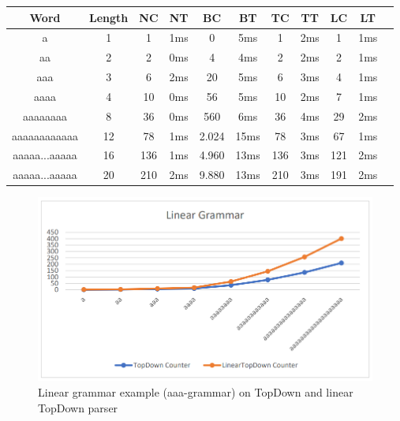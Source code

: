 \documentclass[a4paper, 11pt]{article}
\begin{document}
\begin{center}
\begin{tabular}{|c|c||c|c||c|c||c|c||c|c|c|}
\hline
Word & Length & NC & NT & BC & BT & TC & TT & LC & LT \\
\hline
\hline
a & 1 & 1 & 1ms & 0 & 5ms & 1 & 2ms & 1 & 1ms \\
\hline
aa & 2 & 2 & 0ms & 4 & 4ms & 2 & 2ms & 2 & 1ms \\
\hline
aaa & 3 & 6 & 2ms & 20 & 5ms & 6 & 3ms & 4 & 1ms \\
\hline
aaaa & 4 & 10 & 0ms & 56 & 5ms & 10 & 2ms & 7 & 1ms \\
\hline
aaaaaaaa & 8 & 36 & 0ms & 560 & 6ms & 36 & 4ms & 29 & 2ms \\
\hline
aaaaaaaaaaaa & 12 & 78 & 1ms & 2.024 & 15ms & 78 & 3ms &  67 & 1ms \\
\hline
aaaaa...aaaaa & 16 & 136 & 1ms & 4.960 & 13ms & 136 & 3ms & 121 & 2ms \\
\hline
aaaaa...aaaaa & 20 & 210 & 2ms & 9.880 & 13ms & 210 & 3ms & 191 & 2ms \\
\hline
\end{tabular}
\end{center}

\begin{figure}[H]
\begin{center}
\includegraphics[scale=0.4]{diagrams/LGBTQ.png}
\end{center}
\caption{Linear grammar example (aaa-grammar) on TopDown and linear TopDown parser}
\end{figure}






\end{document}
